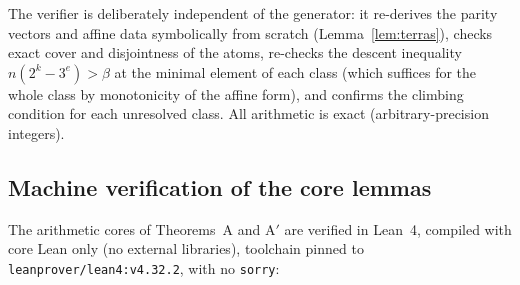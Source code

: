 \documentclass[11pt]{article}
\theoremstyle{definition}
\begin{document}
The verifier is deliberately independent of the generator: it re-derives
the parity vectors and affine data symbolically from scratch
(Lemma~\ref{lem:terras}), checks exact cover and disjointness of the atoms,
re-checks the descent inequality $n(2^k-3^e)>\beta$ at the minimal element
of each class (which suffices for the whole class by monotonicity of the
affine form), and confirms the climbing condition for each unresolved
class. All arithmetic is exact (arbitrary-precision integers).

\subsection{Machine verification of the core lemmas}
The arithmetic cores of Theorems~A and A$'$ are verified in Lean~4,
compiled with core Lean only (no external libraries), toolchain pinned to
\texttt{leanprover/lean4:v4.32.2}, with no \texttt{sorry}:
\end{document}
